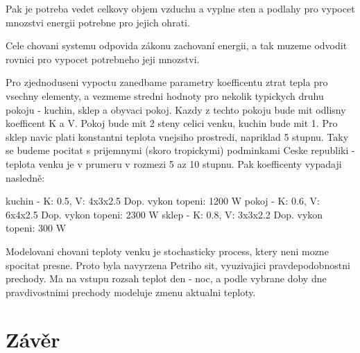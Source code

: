Pak je potreba vedet celkovy objem vzduchu a vyplne sten a podlahy pro vypocet mnozstvi energii potrebne pro jejich ohrati. 

Cele chovani systemu odpovida zákonu zachovaní energii, a tak muzeme odvodit rovnici pro vypocet potrebneho jeji mnozstvi.

Pro zjednoduseni vypoctu zanedbame parametry koefficentu ztrat tepla pro vsechny elementy, a vezmeme stredni hodnoty pro nekolik typickych druhu pokoju - kuchin, sklep a obyvaci pokoj. Kazdy z techto pokoju bude mit odlisny koefficent K a V. Pokoj bude mit 2 steny celici venku, kuchin bude mit 1. Pro sklep navic plati konstantni teplota vnejsiho prostredi, napriklad 5 stupnu. Taky se budeme pocitat s prijemnymi (skoro tropickymi) podminkami Ceske republiki - teplota venku je v prumeru v rozmezi 5 az 10 stupnu. %
Pak koefficenty vypadaji nasledně:

kuchin - K: 0.5, V: 4x3x2.5 Dop. vykon topeni: 1200 W
pokoj - K: 0.6, V: 6x4x2.5 Dop. vykon topeni: 2300 W
sklep - K: 0.8, V: 3x3x2.2 Dop. vykon topeni: 300 W

Modelovani chovani teploty venku je stochasticky process, ktery neni mozne spocitat presne. Proto byla navyrzena Petriho sit, vyuzivajici pravdepodobnostni prechody. Ma na vstupu rozsah teplot den - noc, a podle vybrane doby dne pravdivostnimi prechody modeluje zmenu aktualni teploty.

\chapter{Závěr}
\label{zaver}
